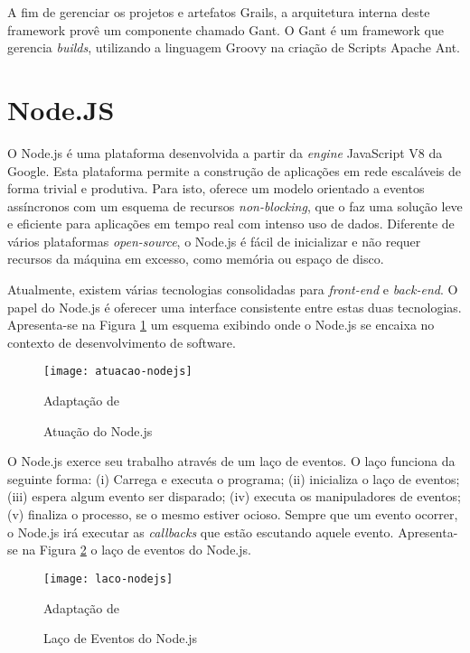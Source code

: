 A fim de gerenciar os projetos e artefatos Grails, a arquitetura interna deste framework provê um componente chamado Gant. O Gant é um framework que gerencia \textit{builds}, utilizando a linguagem Groovy na criação de Scripts Apache Ant.

\section{Node.JS}

O Node.js é uma plataforma desenvolvida a partir da \textit{engine} JavaScript V8 da Google. Esta plataforma permite a construção de aplicações em rede escaláveis de forma trivial e produtiva. Para isto, oferece um modelo orientado a eventos assíncronos com um esquema de recursos \textit{non-blocking}, que o faz uma solução leve e eficiente para aplicações em tempo real com intenso uso de dados. Diferente de vários plataformas \textit{open-source}, o Node.js é fácil de inicializar e não requer recursos da máquina em excesso, como memória ou espaço de disco. 

Atualmente, existem várias tecnologias consolidadas para \textit{front-end} e \textit{back-end}. O papel do Node.js é oferecer uma interface consistente entre estas duas tecnologias. Apresenta-se na Figura \ref{atuacao-nodejs} um esquema exibindo onde o Node.js se encaixa no contexto de desenvolvimento de software.   

\graphicspath{{figuras/}}
\begin{figure}[H]
\centering
\texttt{[image: atuacao-nodejs]}
\caption{Atuação do Node.js}{Adaptação de \cite{wilson2013}} 
\label{atuacao-nodejs}
\end{figure}

O Node.js exerce seu trabalho através de um laço de eventos. O laço funciona da seguinte forma: (i) Carrega e executa o programa; (ii) inicializa o laço de eventos; (iii) espera algum evento ser disparado; (iv) executa os manipuladores de eventos; (v) finaliza o processo, se o mesmo estiver ocioso. Sempre que um evento ocorrer, o Node.js irá executar as \textit{callbacks} que estão escutando aquele evento. Apresenta-se na Figura \ref{laco-nodejs} o laço de eventos do Node.js.

\graphicspath{{figuras/}}
\begin{figure}[H]
\centering
\texttt{[image: laco-nodejs]}
\caption{Laço de Eventos do Node.js}{Adaptação de \cite{wilson2013}} 
\label{laco-nodejs}
\end{figure}

